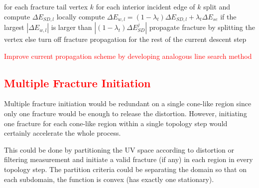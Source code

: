   for each fracture tail vertex $k$
    for each interior incident edge of $k$
      split and compute $\Delta E_{SD, l}$ locally
      compute $\Delta E_{w,l} = (1 - \lambda_t) \Delta E_{SD,l} + \lambda_t \Delta E_{se}$
  if the largest $|\Delta E_{w,l}|$ is larger than $|(1-\lambda_t)\Delta E_{SD}^j|$
    propagate fracture by splitting the vertex
  else
    turn off fracture propagation for the rest of the current descent step

\textcolor{red}{Improve current propagation scheme by developing analogous line search method}

\textcolor{red}{
\subsection{Multiple Fracture Initiation}
}
Multiple fracture initiation would be redundant on a single cone-like region since only one fracture would be enough to release the distortion. However, initiating one fracture for each cone-like region within a single topology step would certainly accelerate the whole process. 

This could be done by partitioning the UV space according to distortion or filtering measurement and initiate a valid fracture (if any) in each region in every topology step. The partition criteria could be separating the domain so that on each subdomain, the function is convex (has exactly one stationary).
